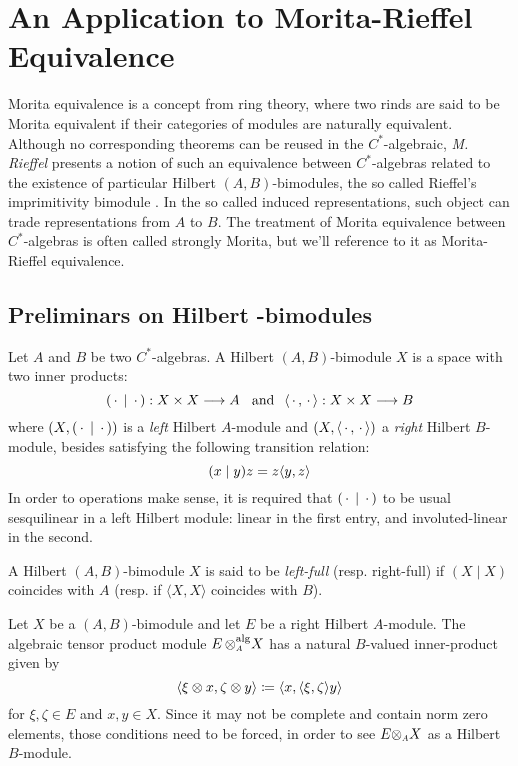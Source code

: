 \chapter{An Application to Morita-Rieffel Equivalence}

Morita equivalence is a concept from ring theory, where two rinds are said to be Morita equivalent if their categories of modules are naturally equivalent. Although no corresponding theorems can be reused in the $C^*$-algebraic, \textit{M. Rieffel} presents a notion of such an equivalence between $C^*$-algebras related to the existence of particular Hilbert $(A,B)$-bimodules, the so called Rieffel's imprimitivity bimodule \cite{rieffel1981c,RIEFFEL1974176, brown1977stable}. In the so called induced representations, such object can trade representations from $A$ to $B$. The treatment of Morita equivalence between $C^*$-algebras is often called strongly Morita, but we'll reference to it as Morita-Rieffel equivalence.

\section[Preliminars on Hilbert \texorpdfstring{\ensuremath{C^*}}{C*}-bimodules]{Preliminars on Hilbert \texorpdfstring{}{C*}-bimodules}

Let $A$ and $B$ be two $C^*$-algebras. A Hilbert $(A,B)$-bimodule $X$ is a space with two inner products:
\begin{equation*}
	(\operatorname{\,\cdot\,}\mid\operatorname{\,\cdot\,}):X\times X \longrightarrow A \hspace{0.25cm}\operatorname{and}\hspace{0.25cm} \langle {\operatorname{\,\cdot\,}},{\operatorname{\,\cdot\,}}\rangle:X\times X \longrightarrow B
\end{equation*} 
where $\left(X, (\operatorname{\,\cdot\,}\mid\operatorname{\,\cdot\,})\right)$ is a \textit{left} Hilbert $A$-module and $\left(X, \langle {\operatorname{\,\cdot\,}},{\operatorname{\,\cdot\,}}\rangle\right)$ a \textit{right} Hilbert $B$-module, besides satisfying the following transition relation:
\begin{equation*}
	(x\mid y)z = z \langle {y},{z}\rangle
\end{equation*}
In order to operations make sense, it is required that $(\operatorname{\,\cdot\,}\mid\operatorname{\,\cdot\,})$ to be usual sesquilinear in a left Hilbert module: linear in the first entry, and involuted-linear in the second.

\begin{definicao}
	A Hilbert $(A,B)$-bimodule $X$ is said to be \textit{left-full} (resp. right-full) if $(X \mid X)$ coincides with $A$ (resp. if $\langle X, X\rangle$ coincides with $B$).
\end{definicao}

Let $X$ be a $(A,B)$-bimodule and let $E$ be a right Hilbert $A$-module. The algebraic tensor product module $E\,\sub\otimes A^{\text{alg}} X$ has a natural $B$-valued inner-product given by
\begin{equation*}
	\langle {\xi\otimes x},{\zeta \otimes y}\rangle \coloneqq \langle {x},{\langle {\xi},{\zeta}\rangle y}\rangle
\end{equation*}
for $\xi,\zeta\in E$ and $x,y\in X$. Since it may not be complete and contain norm zero elements, those conditions need to be forced, in order to see $E \sub\otimes A X$ as a Hilbert $B$-module.

